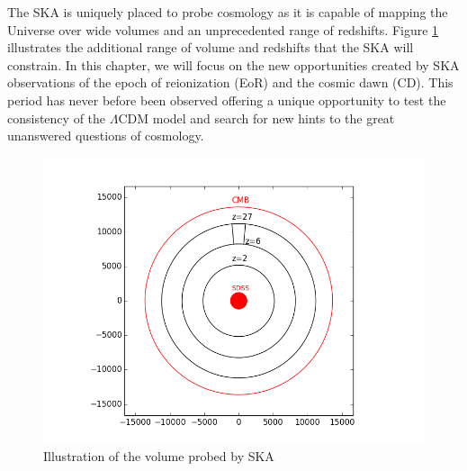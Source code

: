 \documentclass{PoS}
\begin{document}
The SKA is uniquely placed to probe cosmology as it is capable of mapping the Universe over wide volumes and an unprecedented range of redshifts. Figure \ref{fig:volume} illustrates the additional range of volume and redshifts that the SKA will constrain. In this chapter, we will focus on the new opportunities created by SKA observations of the epoch of reionization (EoR) and the cosmic dawn (CD). This period has never before been observed offering a unique opportunity to test the consistency of the $\Lambda$CDM model and search for new hints to the great unanswered questions of cosmology.

\begin{figure}[htbp]
\begin{center}
\includegraphics[scale=0.6]{figures/plotcircles.png}
\caption{Illustration of the volume probed by SKA}
\label{fig:volume}
\end{center}
\end{figure}

\cite{furlanetto2006dm}
\end{document}
